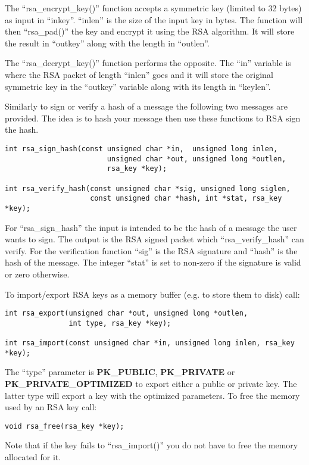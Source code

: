\documentclass{book}
\begin{document}
The ``rsa\_encrypt\_key()'' function accepts a symmetric key (limited to 32 bytes) as input in ``inkey''.  ``inlen''
is the size of the input key in bytes.  The function will then ``rsa\_pad()'' the key and encrypt it using the RSA
algorithm.  It will store the result in ``outkey'' along with the length in ``outlen''.  

The ``rsa\_decrypt\_key()'' function performs the opposite.  The ``in'' variable is where the RSA packet of length 
``inlen'' goes and it will store the original symmetric key in the ``outkey'' variable along with its length in 
``keylen''.

Similarly to sign or verify a hash of a message the following two messages are provided.  The idea is to hash your 
message then use these functions to RSA sign the hash.  
\begin{verbatim}
int rsa_sign_hash(const unsigned char *in,  unsigned long inlen, 
                        unsigned char *out, unsigned long *outlen, 
                        rsa_key *key);

int rsa_verify_hash(const unsigned char *sig, unsigned long siglen,
                    const unsigned char *hash, int *stat, rsa_key *key);
\end{verbatim}
For ``rsa\_sign\_hash'' the input is intended to be the hash of a message the user wants to sign.  The output is the 
RSA signed packet which ``rsa\_verify\_hash'' can verify.  For the verification function ``sig'' is the RSA signature
and ``hash'' is the hash of the message.  The integer ``stat'' is set to non-zero if the signature is valid or zero 
otherwise.

To import/export RSA keys as a memory buffer (e.g. to store them to disk) call:
\begin{verbatim}
int rsa_export(unsigned char *out, unsigned long *outlen, 
               int type, rsa_key *key);

int rsa_import(const unsigned char *in, unsigned long inlen, rsa_key *key);
\end{verbatim}

The ``type'' parameter is {\bf PK\_PUBLIC}, {\bf PK\_PRIVATE} or {\bf PK\_PRIVATE\_OPTIMIZED} to export either a public or 
private key.  The latter type will export a key with the optimized parameters.  To free the memory used by an RSA key call:
\begin{verbatim}
void rsa_free(rsa_key *key);
\end{verbatim}

Note that if the key fails to ``rsa\_import()'' you do not have to free the memory allocated for it.
\end{document}

